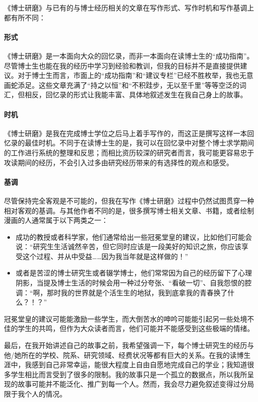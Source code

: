 \documentclass[letter,12pt]{book}
\newcommand{\bookname}{博士研磨}
\begin{document}
\begin{CJK}{UTF8}{gbsn}
《\bookname》与已有的与博士经历相关的文章在写作形式、写作时机和写作基调上都有所不同：

\paragraph{形式} 《\bookname》是一本面向大众的回忆录，而非一本面向在读博士生的“成功指南”。尽管博士生也能在我的经历中学习到经验和教训，但我的目标并不是直接提供建议。对于博士生而言，市面上的“成功指南”和“建议专栏”已经不胜枚举，我也无意画蛇添足。这些文章充满了“持之以恒”和“不积跬步，无以至千里”等等空泛的词汇，但相反，回忆录的形式让我能丰富、具体地叙述发生在我自己身上的故事。

\paragraph{时机} 《\bookname》是我在完成博士学位之后马上着手写作的，而这正是撰写这样一本回忆录的最佳时机。不同于在读博士生的是，我可以在回忆录中对整个博士求学期间的工作进行系统的整理和反思；而相比资历较深的研究者而言，我可能更容易忠于攻读期间的经历，不会引入过多由研究经历带来的有选择性的观点和感受。


\paragraph{基调} 尽管保持完全客观是不可能的，但我在写作《\bookname》过程中仍然试图贯穿一种相对客观的基调。与其他作者不同的是，很多撰写博士相关文章、书籍，或者绘制漫画的人通常属于以下两类之一：
\begin{itemize}
\item 成功的教授或者科学家，他们通常给出一些冠冕堂皇的建议，比如他们可能会说：“研究生生活诚然辛苦，但它同时应该是一段美好的知识之旅，你应该享受这个过程、并从中受益……因为我当年就是这样做的！”
\item 或者是苦涩的博士研究生或者辍学博士，他们常常因为自己的经历留下了心理阴影，当提及博士生活的时候会用一种过分夸张、“看破一切”、自我怨恨的腔调：“啊，那时我的世界就是个活生生的地狱，我到底拿我的青春换了什么？！？”
\end{itemize}

冠冕堂皇的建议可能能激励一些学生，而大倒苦水的呻吟可能能引起另一些处境不佳的学生的共鸣，但作为大众读者而言，他们可能并不能感受到这些极端的情绪。

最后，在我开始讲述自己的故事之前，我希望强调一下，每个博士研究生的经历与他/她所在的学校、院系、研究领域、经费状况等都有巨大的关系。在我的读博生涯中，我感到自己非常幸运，能很大程度上自由自愿地完成自己的学业；我知道很多学生相比而言受到了很多的限制。我的故事只是一个孤立的数据点，所以我所呈现的故事可能并不能泛化、推广到每一个人。然而，我会尽力避免叙述变得过分局限于我个人的情况。


\end{CJK}
\end{document}
